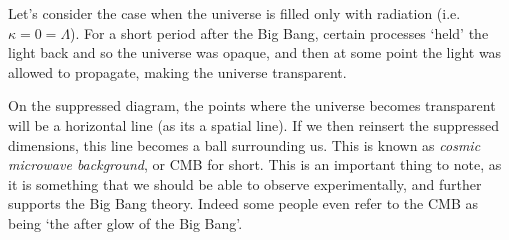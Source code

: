 Let's consider the case when the universe is filled only with radiation (i.e. $\kappa=0=\Lambda$). For a short period after the Big Bang, certain processes `held' the light back and so the universe was opaque, and then at some point the light was allowed to propagate, making the universe transparent. 

On the suppressed diagram, the points where the universe becomes transparent will be a horizontal line (as its a spatial line). If we then reinsert the suppressed dimensions, this line becomes a ball surrounding us. This is known as \textit{cosmic microwave background}, or CMB for short. This is an important thing to note, as it is something that we should be able to observe experimentally, and further supports the Big Bang theory. Indeed some people even refer to the CMB as being `the after glow of the Big Bang'. 

